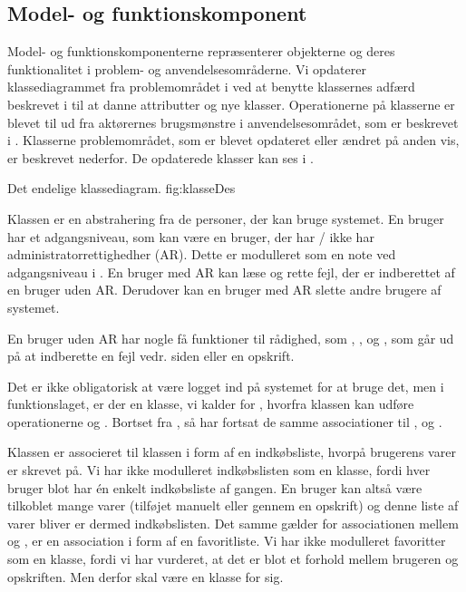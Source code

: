 \subsection{Model- og funktionskomponent}
\label{sec:modelfunktion}

Model- og funktionskomponenterne repræsenterer objekterne og deres funktionalitet i problem- og anvendelsesområderne. Vi opdaterer klassediagrammet fra problemområdet i  ved at benytte klassernes adfærd beskrevet i  til at danne attributter og nye klasser. Operationerne på klasserne er blevet til ud fra aktørernes brugsmønstre i anvendelsesområdet, som er beskrevet i . Klasserne problemområdet, som er blevet opdateret eller ændret på anden vis, er beskrevet nederfor. De opdaterede klasser kan ses i .



	{Det endelige klassediagram.}
	{fig:klasseDes}


Klassen  er en abstrahering fra de personer, der kan bruge systemet. En bruger har et adgangsniveau, som kan være en bruger, der har / ikke har administratorrettighedher (AR). Dette er modulleret som en note ved adgangsniveau i . En bruger med AR kan læse og rette fejl, der er indberettet af en bruger uden AR. Derudover kan en bruger med AR slette andre brugere af systemet.

En bruger uden AR har nogle få funktioner til rådighed, som \fx {}, ,  og , som går ud på at indberette en fejl vedr. siden eller en opskrift.

Det er ikke obligatorisk at være logget ind på systemet for at bruge det, men i funktionslaget, er der en klasse, vi kalder for , hvorfra klassen  kan udføre operationerne  og . Bortset fra , så har  fortsat de samme associationer til ,  og . 

Klassen  er associeret til klassen  i form af en indkøbsliste, hvorpå brugerens varer er skrevet på. Vi har ikke modulleret indkøbslisten som en klasse, fordi hver bruger blot har én enkelt indkøbsliste af gangen. En bruger kan altså være tilkoblet mange varer (tilføjet manuelt eller gennem en opskrift) og denne liste af varer bliver er dermed indkøbslisten. Det samme gælder for associationen mellem  og , er en association i form af en favoritliste. Vi har ikke modulleret favoritter som en klasse, fordi vi har vurderet, at det er blot et forhold mellem brugeren og opskriften. Men derfor skal  være en klasse for sig.

